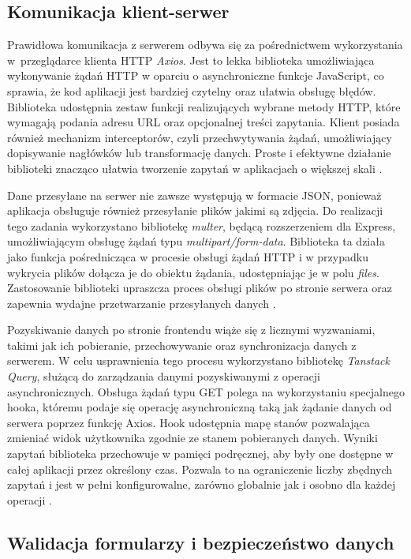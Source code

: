 \subsection{Komunikacja klient-serwer}

Prawidłowa komunikacja z serwerem odbywa się za pośrednictwem wykorzystania w~przeglądarce klienta HTTP \emph{Axios}.
Jest to lekka biblioteka umożliwiająca wykonywanie żądań HTTP w oparciu o asynchroniczne funkcje JavaScript, co sprawia, że kod aplikacji jest bardziej czytelny oraz ułatwia obsługę błędów.
Biblioteka udostępnia zestaw funkcji realizujących wybrane metody HTTP, które wymagają podania adresu URL oraz opcjonalnej treści zapytania.
Klient posiada również mechanizm interceptorów, czyli przechwytywania żądań, umożliwiający dopisywanie nagłówków lub transformację danych.
Proste i efektywne działanie biblioteki znacząco ułatwia tworzenie zapytań w aplikacjach o większej skali \autocite{axios_intro}.

Dane przesyłane na serwer nie zawsze występują w formacie JSON, ponieważ aplikacja obsługuje również przesyłanie plików jakimi są zdjęcia.
Do realizacji tego zadania wykorzystano bibliotekę \emph{multer}, będącą rozszerzeniem dla Express, umożliwiającym obsługę żądań typu \emph{multipart/form-data}.
Biblioteka ta działa jako funkcja pośrednicząca w procesie obsługi żądań HTTP i w przypadku wykrycia plików dołącza je do obiektu żądania, udostępniając je w polu \emph{files}.
Zastosowanie biblioteki upraszcza proces obsługi plików po stronie serwera oraz zapewnia wydajne przetwarzanie przesyłanych danych \autocite{multer_redame}.

Pozyskiwanie danych po stronie frontendu wiąże się z licznymi wyzwaniami, takimi jak ich pobieranie, przechowywanie oraz synchronizacja danych z serwerem.
W celu usprawnienia tego procesu wykorzystano bibliotekę \emph{Tanstack Query}, służącą do zarządzania danymi pozyskiwanymi z operacji asynchronicznych.
Obsługa żądań typu GET polega na wykorzystaniu specjalnego hooka, któremu podaje się operację asynchroniczną taką jak żądanie danych od serwera poprzez funkcję Axios.
Hook udostępnia mapę stanów pozwalająca zmieniać widok użytkownika zgodnie ze stanem pobieranych danych.
Wyniki zapytań biblioteka przechowuje w pamięci podręcznej, aby były one dostępne w całej aplikacji przez określony czas.
Pozwala to na ograniczenie liczby zbędnych zapytań i jest w pełni konfigurowalne, zarówno globalnie jak i osobno dla każdej operacji \autocite{tanstack_queryoverview}.

\subsection{Walidacja formularzy i bezpieczeństwo danych}

